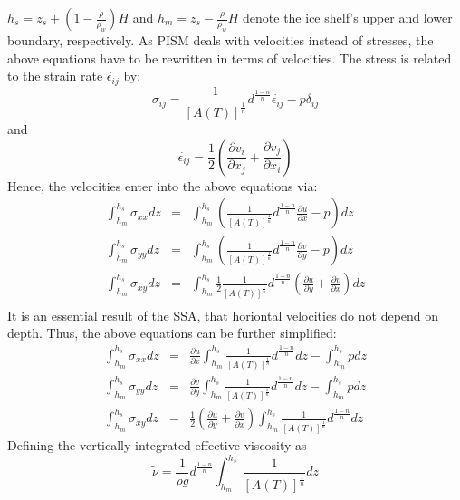 \documentclass[a4paper,10pt]{article}
\begin{document}
$h_s=z_s+(1-\frac{\rho}{\rho_w})H$ and
$h_m=z_s-\frac{\rho}{\rho_w}H$ denote the ice shelf's upper and lower boundary,
respectively. As PISM deals with velocities instead of stresses, the above equations have to be rewritten in terms of velocities. The stress is related to the strain rate $\dot{\epsilon_{ij}}$ by:
\begin{equation*}
\sigma_{ij}=\frac{1}{\left[A(T)\right]^{\frac{1}{n}}}d^{\frac{1-n}{n}} \dot{\epsilon_{ij}} - p\delta_{ij}
\end{equation*}
and
\begin{equation*}
\dot{\epsilon_{ij}}=\frac{1}{2}\left(\frac{\partial v_i}{\partial x_j}+\frac{\partial v_j}{\partial x_i}  \right)
\end{equation*}
Hence, the velocities enter into the above equations via:
\begin{eqnarray*}
\int_{h_m}^{h_s}\sigma_{xx}dz & = & \int_{h_m}^{h_s}\left(\frac{1}{\left[A(T)\right]^{\frac{1}{n}}}d^{\frac{1-n}{n}}\frac{\partial u}{\partial x}-p \right) dz\\
\int_{h_m}^{h_s}\sigma_{yy}dz & = & \int_{h_m}^{h_s}\left(\frac{1}{\left[A(T)\right]^{\frac{1}{n}}}d^{\frac{1-n}{n}}\frac{\partial v}{\partial y}-p \right) dz\\
\int_{h_m}^{h_s}\sigma_{xy}dz & = &  \int_{h_m}^{h_s}\frac{1}{2}\frac{1}{\left[A(T)\right]^{\frac{1}{n}}}d^{\frac{1-n}{n}}\left(\frac{\partial u}{\partial y}+\frac{\partial v}{\partial x} \right)dz  \\
\end{eqnarray*}
It is an essential result of the SSA, that horiontal velocities do not depend on depth. Thus, the above equations can be further simplified:
\begin{eqnarray*}
\int_{h_m}^{h_s}\sigma_{xx}dz & = & \frac{\partial u}{\partial x} \int_{h_m}^{h_s}\frac{1}{\left[A(T)\right]^{\frac{1}{n}}}d^{\frac{1-n}{n}}dz-\int_{h_m}^{h_s}p dz \\
\int_{h_m}^{h_s}\sigma_{yy}dz & = & \frac{\partial v}{\partial y} \int_{h_m}^{h_s}\frac{1}{\left[A(T)\right]^{\frac{1}{n}}}d^{\frac{1-n}{n}}dz-\int_{h_m}^{h_s}p dz \\
\int_{h_m}^{h_s}\sigma_{xy}dz & = & \frac{1}{2}\left(\frac{\partial u}{\partial y}+\frac{\partial v}{\partial x} \right)\int_{h_m}^{h_s}\frac{1}{\left[A(T)\right]^{\frac{1}{n}}}d^{\frac{1-n}{n}}dz
\end{eqnarray*}
Defining the vertically integrated effective viscosity as
\begin{equation}%
\tilde{\nu}=\frac{1}{\rho g}d^{\frac{1-n}{n}}\int_{h_m}^{h_s}\frac{1}{\left[A(T)\right]^{\frac{1}{n}}}dz
\label{myNu}
\end{equation}
\end{document}
